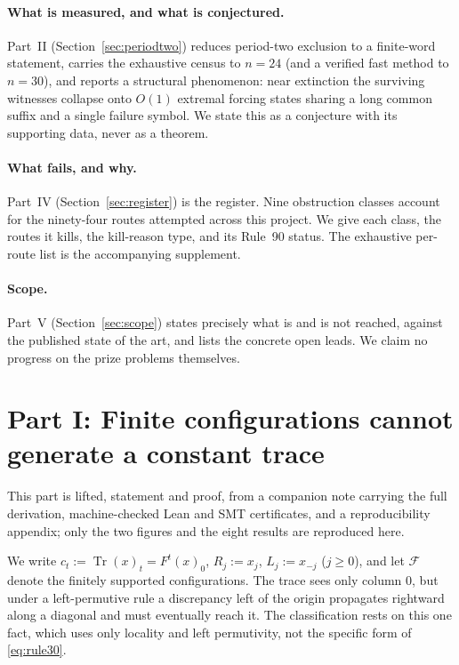 \documentclass[11pt]{article}
\theoremstyle{definition}
\newcommand{\F}{\mathcal F}
\newcommand{\Tr}{\operatorname{Tr}}
\begin{document}
\paragraph{What is measured, and what is conjectured.} Part~II
(Section~\ref{sec:periodtwo}) reduces period-two exclusion to a finite-word
statement, carries the exhaustive census to $n=24$ (and a verified fast method to
$n=30$), and reports a structural phenomenon: near extinction the surviving
witnesses collapse onto $O(1)$ extremal forcing states sharing a long common
suffix and a single failure symbol. We state this as a conjecture with its
supporting data, never as a theorem.

\paragraph{What fails, and why.} Part~IV (Section~\ref{sec:register}) is the
register. Nine obstruction classes account for the ninety-four
routes attempted across this project. We give each class, the routes it kills,
the kill-reason type, and its Rule~90 status. The exhaustive per-route list is
the accompanying supplement.

\paragraph{Scope.} Part~V (Section~\ref{sec:scope}) states precisely what is and
is not reached, against the published state of the art, and lists the concrete
open leads. We claim no progress on the prize problems themselves.

\section{Part I: Finite configurations cannot generate a constant trace}
\label{sec:periodone}

This part is lifted, statement and proof, from a companion note carrying the
full derivation, machine-checked Lean and SMT certificates, and a
reproducibility appendix; only the two figures and the eight results are
reproduced here.

We write $c_t:=\Tr(x)_t=F^t(x)_0$, $R_j:=x_j$, $L_j:=x_{-j}$ ($j\ge0$), and let
$\F$ denote the finitely supported configurations. The trace sees only column
$0$, but under a left-permutive rule a discrepancy left of the origin
propagates rightward along a diagonal and must eventually reach it. The
classification rests on this one fact, which uses only locality and left
permutivity, not the specific form of \eqref{eq:rule30}.
\end{document}
